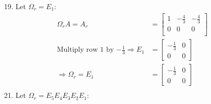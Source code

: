 \documentclass[11pt]{homework}
\begin{document}
19. Let $\Omega_r = E_1$:
\begin{align*}
  \Omega_r A = A_r &= 
  \begin{bmatrix}
  1 & -\frac{4}{3} & -\frac{4}{3} \\
  0 & 0 & 0 \\
  \end{bmatrix} \\
\text{Multiply row 1 by $-\frac{1}{3}$}
\Rightarrow
E_1 &= 
  \begin{bmatrix}
  -\frac{1}{3} & 0 \\
  0 & 0
  \end{bmatrix} \\
\Rightarrow
\Omega_r = E_1 &= 
  \begin{bmatrix}
  -\frac{1}{3} & 0 \\
  0 & 0
  \end{bmatrix} \\
\end{align*}
21. Let $\Omega_r = E_5 E_4 E_3 E_2 E_1$:
\end{document}
